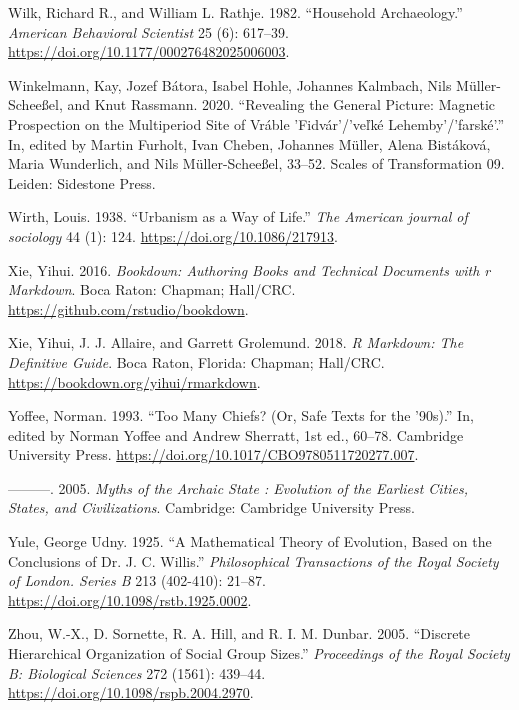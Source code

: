 \documentclass[
  12pt,
  a4paper, twoside]{book}
\newlength{\cslhangindent}
\newlength{\cslentryspacingunit} %
\newenvironment{CSLReferences}[2] %
 {%
  \setlength{\parindent}{0pt}
  \ifodd #1
  \let\oldpar\par
  \def\par{\hangindent=\cslhangindent\oldpar}
  \fi
  \setlength{\parskip}{#2\cslentryspacingunit}
 }%
 {}
\begin{document}
\begin{CSLReferences}{1}{0}
\leavevmode{}%
Wilk, Richard R., and William L. Rathje. 1982. {``Household Archaeology.''} \emph{American Behavioral Scientist} 25 (6): 617--39. \url{https://doi.org/10.1177/000276482025006003}.

\leavevmode{}%
Winkelmann, Kay, Jozef Bátora, Isabel Hohle, Johannes Kalmbach, Nils Müller-Scheeßel, and Knut Rassmann. 2020. {``Revealing the General Picture: Magnetic Prospection on the Multiperiod Site of Vráble 'Fidvár'/'ve{ľ}ké Lehemby'/'farské'.''} In, edited by Martin Furholt, Ivan Cheben, Johannes Müller, Alena Bistáková, Maria Wunderlich, and Nils Müller-Scheeßel, 33--52. Scales of Transformation 09. Leiden: Sidestone Press.

\leavevmode{}%
Wirth, Louis. 1938. {``Urbanism as a Way of Life.''} \emph{The American journal of sociology} 44 (1): 124. \url{https://doi.org/10.1086/217913}.

\leavevmode{}%
Xie, Yihui. 2016. \emph{Bookdown: Authoring Books and Technical Documents with r Markdown}. Boca Raton: Chapman; Hall/CRC. \url{https://github.com/rstudio/bookdown}.

\leavevmode{}%
Xie, Yihui, J. J. Allaire, and Garrett Grolemund. 2018. \emph{R Markdown: The Definitive Guide}. Boca Raton, Florida: Chapman; Hall/CRC. \url{https://bookdown.org/yihui/rmarkdown}.

\leavevmode{}%
Yoffee, Norman. 1993. {``Too Many Chiefs? (Or, Safe Texts for the '90s).''} In, edited by Norman Yoffee and Andrew Sherratt, 1st ed., 60--78. Cambridge University Press. \url{https://doi.org/10.1017/CBO9780511720277.007}.

\leavevmode{}%
---------. 2005. \emph{Myths of the Archaic State : Evolution of the Earliest Cities, States, and Civilizations}. Cambridge: Cambridge University Press.

\leavevmode{}%
Yule, George Udny. 1925. {``A Mathematical Theory of Evolution, Based on the Conclusions of Dr. J. C. Willis.''} \emph{Philosophical Transactions of the Royal Society of London. Series B} 213 (402-410): 21--87. \url{https://doi.org/10.1098/rstb.1925.0002}.

\leavevmode{}%
Zhou, W.-X., D. Sornette, R. A. Hill, and R. I. M. Dunbar. 2005. {``Discrete Hierarchical Organization of Social Group Sizes.''} \emph{Proceedings of the Royal Society B: Biological Sciences} 272 (1561): 439--44. \url{https://doi.org/10.1098/rspb.2004.2970}.


\end{CSLReferences}
\end{document}
